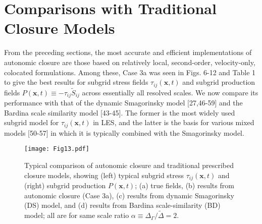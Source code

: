 \graphicspath{ {./Ch6/}  } 

\chapter{Comparisons with Traditional Closure Models}

From the preceding sections, the most accurate and efficient implementations of autonomic closure are those based on relatively local, second-order, velocity-only, colocated formulations. Among these, Case 3a was seen in Figs. 6-12 and Table 1 to give the best results for subgrid stress fields $\tau_{ij}(\mathbf{x},t)$  and subgrid production fields $P(\mathbf{x},t) \equiv -\tau_{ij}\widetilde{S}_{ij}$  across essentially all resolved scales. We now compare its performance with that of the dynamic Smagorinsky model [27,46-59] and the Bardina scale similarity model [43-45]. The former is the most widely used subgrid model for $\tau_{ij}(\mathbf{x},t)$  in LES, and the latter is the basis for various mixed models [50-57] in which it is typically combined with the Smagorinsky model. 

%
\begin{figure}
	\begin{center}
	\texttt{[image: Fig13.pdf]}
	\caption{ Typical comparison of autonomic closure and traditional prescribed closure models, showing (left) typical subgrid stress $\tau_{ij}(\mathbf{x},t)$ and (right) subgrid production $P(\mathbf{x},t)$; (a) true fields, (b) results from autonomic closure (Case 3a), (c) results from dynamic Smagorinsky (DS) model, and (d) results from Bardina scale-similarity (BD) model; all are for same scale ratio $\alpha \equiv \Delta_{\Gamma} / \widetilde{\Delta} = 2$.}
	\label{F:13}
	\end{center}
\end{figure}
%
%


